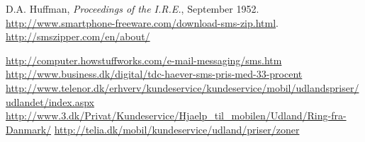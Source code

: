  D.A. Huffman, {\it Proceedings of the I.R.E.}, September 1952.
 {\url{http://www.smartphone-freeware.com/download-sms-zip.html}}.
 {\url{http://smszipper.com/en/about/}}

 {\url{http://computer.howstuffworks.com/e-mail-messaging/sms.htm}}
 {\url{http://www.business.dk/digital/tdc-haever-sms-pris-med-33-procent}}
 {\url{http://www.telenor.dk/erhverv/kundeservice/kundeservice/mobil/udlandspriser/udlandet/index.aspx}}
 {\url{http://www.3.dk/Privat/Kundeservice/Hjaelp_til_mobilen/Udland/Ring-fra-Danmark/}}
 {\url{http://telia.dk/mobil/kundeservice/udland/priser/zoner}}


